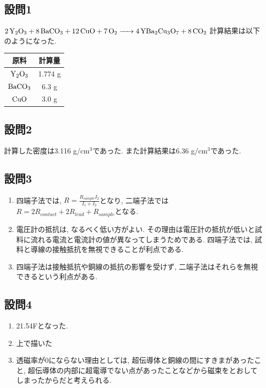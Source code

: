 \documentclass[11pt]{ltjsarticle}
\begin{document}
    \subsection*{設問1}
      $\ce{2Y2O3 + 8BaCO3 +12CuO +7O2 -> 4YBa2Cu3O7 + 8CO2}$
      計算結果は以下のようになった.
      \begin{table}[H]
        \centering
        \begin{tabular}{|c|c|}\hline
        原料 & 計算量 \\\hline
        $\ce{Y2O3}$ & 1.774 g \\\hline
        $\ce{BaCO3}$ & 6.3 g \\\hline
        $\ce{CuO}$ & 3.0 g \\\hline
        \end{tabular}
      \end{table}
    \subsection*{設問2}
      計算した密度は3.116 g/cm$^3$であった. また計算結果は6.36 g/cm$^3$であった.
    \subsection*{設問3}
      \begin{enumerate}
        \item 四端子法では, $R=\frac{R_{sample}I_2}{I_1+I_2}$となり, 二端子法では$R=2R_{contact}+2R_{lead}+R_{sample}$となる.
        \item 電圧計の抵抗は, なるべく低い方がよい. その理由は電圧計の抵抗が低いと試料に流れる電流と電流計の値が異なってしまうためである. 四端子法では, 試料と導線の接触抵抗を無視できることが利点である.
        \item 四端子法は接触抵抗や銅線の抵抗の影響を受けず, 二端子法はそれらを無視できるという利点がある.
      \end{enumerate}
    \subsection*{設問4}
      \begin{enumerate}
        \item 21.54\mu Fとなった.
        \item 上で描いた
        \item 透磁率が0にならない理由としては, 超伝導体と銅線の間にすきまがあったこと, 超伝導体の内部に超電導でない点があったことなどから磁束をとおしてしまったからだと考えられる.
      \end{enumerate}
\end{document}
